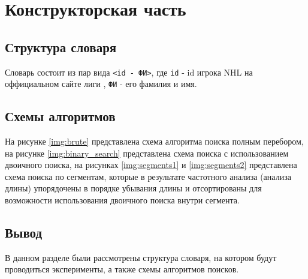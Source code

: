 \chapter{Конструкторская часть}

\section{Структура словаря}

Словарь состоит из пар вида \texttt{<id - ФИ>}, где \texttt{id} - id игрока NHL \cite{nhl} на оффициальном сайте лиги \cite{nhl}, \texttt{ФИ} - его фамилия и имя.

\section{Схемы алгоритмов}

На рисунке \ref{img:brute} представлена схема алгоритма поиска полным перебором, на рисунке \ref{img:binary_search} представлена схема поиска с использованием двоичного поиска, на рисунках \ref{img:segments1} и \ref{img:segments2} представлена схема поиска по сегментам, которые в результате частотного анализа (анализа длины) упорядочены в порядке убывания длины и отсортированы для возможности использования двоичного поиска внутри сегмента.

\clearpage
{}
\clearpage
{}
\clearpage
{}
\clearpage

\section*{Вывод}

В данном разделе были рассмотрены структура словаря, на котором будут проводиться эксперименты, а также схемы алгоритмов поисков.
